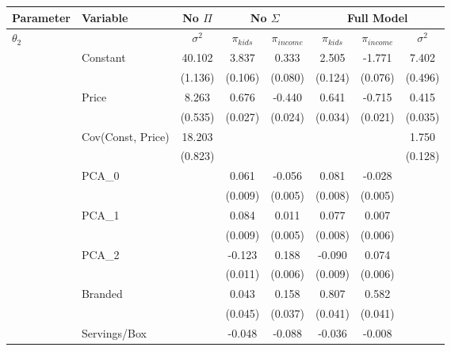 \begin{tabular}{ll|c|cc|ccc} 
 \toprule 
 Parameter & Variable & \multicolumn{1}{c}{No $\Pi$ } & \multicolumn{2}{|c|}{No $\Sigma$ } & \multicolumn{3}{c}{Full Model} \\ 
 \midrule 
$\theta_2$ & & $\sigma^2$ & $\pi_{kids}$ & $\pi_{income}$ & $\pi_{kids}$ & $\pi_{income}$ & $\sigma^2$ \\ 
 \cmidrule(lr){1-1}\cmidrule{2-8} 
{} &          Constant &        40.102 &       3.837 &      0.333 &     2.505 &   -1.771 &    7.402 \\
{} &                   &         (1.136) &       (0.106) &      (0.080) &     (0.124) &    (0.076) &    (0.496) \\
{} &             Price &         8.263 &       0.676 &     -0.440 &     0.641 &   -0.715 &    0.415 \\
{} &                   &         (0.535) &       (0.027) &      (0.024) &     (0.034) &    (0.021) &    (0.035) \\
{} & Cov(Const, Price) &        18.203 &             &            &           &          &    1.750 \\
{} &                   &         (0.823) &             &            &           &          &    (0.128) \\
{} &             PCA\_0 &               &       0.061 &     -0.056 &     0.081 &   -0.028 &          \\
{} &                   &               &       (0.009) &      (0.005) &     (0.008) &    (0.005) &          \\
{} &             PCA\_1 &               &       0.084 &      0.011 &     0.077 &    0.007 &          \\
{} &                   &               &       (0.009) &      (0.005) &     (0.008) &    (0.006) &          \\
{} &             PCA\_2 &               &      -0.123 &      0.188 &    -0.090 &    0.074 &          \\
{} &                   &               &       (0.011) &      (0.006) &     (0.009) &    (0.006) &          \\
{} &           Branded &               &       0.043 &      0.158 &     0.807 &    0.582 &          \\
{} &                   &               &       (0.045) &      (0.037) &     (0.041) &    (0.041) &          \\
{} &      Servings/Box &               &      -0.048 &     -0.088 &    -0.036 &   -0.008 &          \\

\end{tabular}
